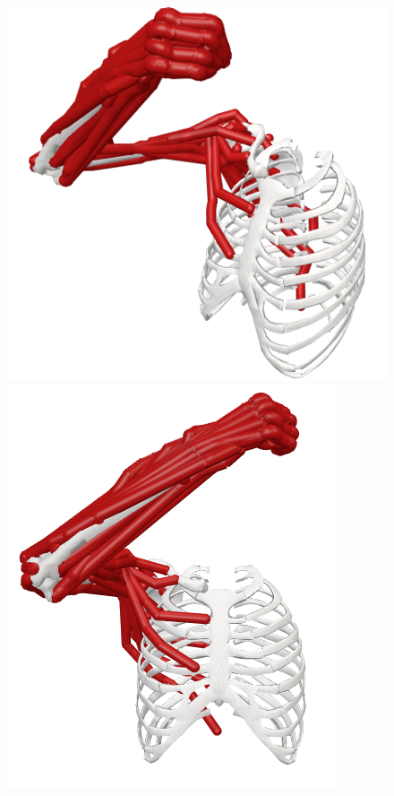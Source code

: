 \begin{figure}[!htb]
    \centering
    \captionsetup{justification=centering}
    \begin{minipage}{0.3\linewidth}
        \centering
        \includegraphics[trim={0 0 0 0}, clip, width=0.8\linewidth]{img/chapter_4/pose_3_view.png}
    \end{minipage}
    \hfill
    \begin{minipage}{0.3\linewidth}
        \captionsetup{justification=centering}
        \centering
        \includegraphics[trim={0 0 0 0}, clip, width=0.7\linewidth]{img/chapter_4/pose_3_front.png}

\end{minipage}
\end{figure}
